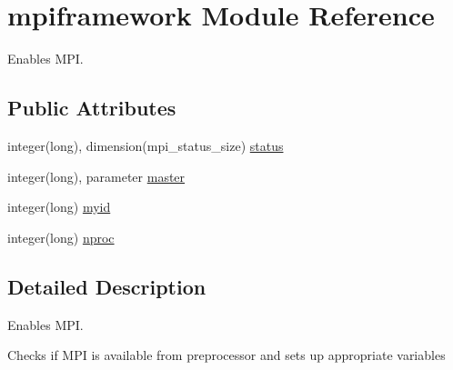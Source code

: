 \hypertarget{classmpiframework}{\section{mpiframework Module Reference}
\label{classmpiframework}
}


Enables M\-P\-I.  


\subsection*{Public Attributes}
\begin{DoxyCompactItemize}
\item 
integer(long), dimension(mpi\-\_\-status\-\_\-size) \hyperlink{classmpiframework_ab7c6b211b6d67a29e8b7e2cefe97d5b2}{status}
\item 
integer(long), parameter \hyperlink{classmpiframework_ae3cf75bc4150b05cabe037cf7478d4a0}{master}
\item 
integer(long) \hyperlink{classmpiframework_ae833a6cbdc45698ffa99a650f0e6bb2d}{myid}
\item 
integer(long) \hyperlink{classmpiframework_af70b38210cb3bcccdc873618ffb3de35}{nproc}
\end{DoxyCompactItemize}


\subsection{Detailed Description}
Enables M\-P\-I. 

Checks if M\-P\-I is available from preprocessor and sets up appropriate variables 

